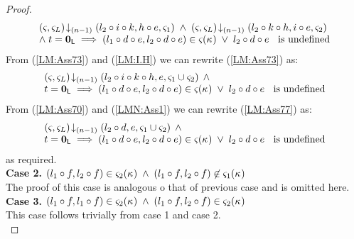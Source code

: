 \begin{lemma}[]
\begin{proof}
\begin{align}
	\begin{array}{l}
		\left(\varsigma_{}, \varsigma_{L}\right) \!\downarrow_{(n-1)} \left(l_2 \circ i \circ k, h \circ e, \varsigma_{1}\right) \;\land\;
		\left(\varsigma_{}, \varsigma_{L}\right) \!\downarrow_{(n-1)} \left(l_2 \circ k \circ h, i \circ e, \varsigma_{2}\right)\\
		\land\; t = \mathbf{0}_{\textsf{L}} \implies (l_1 \circ d \circ e, l_2 \circ d \circ e) \in \varsigma_{}(\kappa_{}) \;\lor\; l_2 \circ d \circ e \hspace*{0.2cm}\text{ is undefined}
	\end{array} \label{LM:Ass73}
\end{align}
From (\ref{LM:Ass73}) and (\ref{LM:I.H}) we can rewrite (\ref{LM:Ass73}) as:
%
\begin{align}
	\begin{array}{l}
		\left(\varsigma_{}, \varsigma_{L}\right) \!\downarrow_{(n-1)} \left(l_2 \circ i \circ k \circ h, e, \varsigma_{1} \cup \varsigma_{2}\right) \;\land\\
		t = \mathbf{0}_{\textsf{L}} \implies (l_1 \circ d \circ e, l_2 \circ d \circ e) \in \varsigma_{}(\kappa_{}) \;\lor\; l_2 \circ d \circ e \hspace*{0.2cm}\text{ is undefined}
	\end{array} \label{LM:Ass77}
\end{align}
From (\ref{LM:Ass70}) and (\ref{LMN:Ass1}) we can rewrite (\ref{LM:Ass77}) as:
%
\begin{align}
	\begin{array}{l}
		\left(\varsigma_{}, \varsigma_{L}\right) \!\downarrow_{(n-1)} \left(l_2 \circ d, e, \varsigma_{1} \cup \varsigma_{2}\right) \;\land\\
		t = \mathbf{0}_{\textsf{L}} \implies (l_1 \circ d \circ e, l_2 \circ d \circ e) \in \varsigma_{}(\kappa_{}) \;\lor\; l_2 \circ d \circ e \hspace*{0.2cm}\text{ is undefined}
	\end{array}
	 \label{LM:Case3.1.2}
\end{align}
as required.\\
%
%
%
%
%

\noindent\textbf{Case 2.} $(l_1 \circ f, l_2 \circ f) \in \varsigma_{2}(\kappa_{}) \;\land\; (l_1 \circ f, l_2 \circ f) \not\in \varsigma_{1}(\kappa_{})$\\
The proof of this case is analogous o that of previous case and is omitted here.\\

\noindent\textbf{Case 3.} $(l_1 \circ f, l_1 \circ f) \in \varsigma_{2}(\kappa_{}) \;\land\; (l_1 \circ f, l_2 \circ f) \in \varsigma_{2}(\kappa_{})$\\
This case follows trivially from case 1 and case 2. \\


\end{proof}
\end{lemma}
%
%